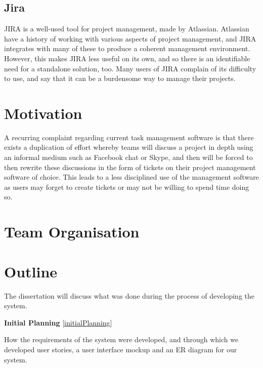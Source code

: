 \documentclass[a4paper]{l3proj}
\begin{document}
  \subsection{Jira}
  \label{jira}
  JIRA is a well-used tool for project management, made by Atlassian. Atlassian have a history of working with various aspects of project management, and JIRA integrates with many of these to produce a coherent management environment. However, this makes JIRA less useful on its own, and so there is an identifiable need for a standalone solution, too. Many users of JIRA complain of its difficulty to use, and say that it can be a burdensome way to manage their projects.

  \section{Motivation}
  \label{motivation}

  A recurring complaint regarding current task management software is that there exists a duplication of effort whereby teams will discuss a project in depth using an informal medium such as Facebook chat or Skype, and then will be forced to then rewrite these discussions in the form of tickets on their project management software of choice.  This leads to a less disciplined use of the management software as users may forget to create tickets or may not be willing to spend time doing so.

  \section{Team Organisation}
  \label{teamOrganisation}

  \section{Outline}
  \label{outline}

  The dissertation will discuss what was done during the process of developing the system.

  \textbf{Initial Planning} \autoref{initialPlanning}

  How the requirements of the system were developed, and through which we developed user stories, a user interface mockup and an ER diagram for our system.
\end{document}

